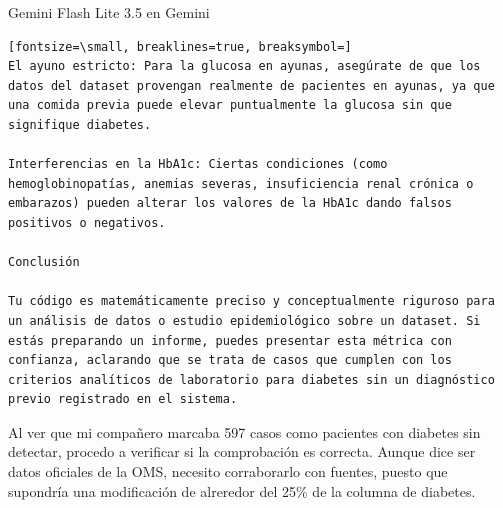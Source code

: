 \documentclass[12pt,a4paper,oneside]{book}
\begin{document}
\begin{iaresp}{Gemini Flash Lite 3.5 en Gemini}
\begin{Verbatim}[fontsize=\small, breaklines=true, breaksymbol=]
El ayuno estricto: Para la glucosa en ayunas, asegúrate de que los datos del dataset provengan realmente de pacientes en ayunas, ya que una comida previa puede elevar puntualmente la glucosa sin que signifique diabetes.

Interferencias en la HbA1c: Ciertas condiciones (como hemoglobinopatías, anemias severas, insuficiencia renal crónica o embarazos) pueden alterar los valores de la HbA1c dando falsos positivos o negativos.

Conclusión

Tu código es matemáticamente preciso y conceptualmente riguroso para un análisis de datos o estudio epidemiológico sobre un dataset. Si estás preparando un informe, puedes presentar esta métrica con confianza, aclarando que se trata de casos que cumplen con los criterios analíticos de laboratorio para diabetes sin un diagnóstico previo registrado en el sistema.
\end{Verbatim}
\end{iaresp}
\begin{iaanalisis}
Al ver que mi compañero marcaba 597 casos como pacientes con diabetes sin detectar, procedo a verificar si la comprobación es correcta. Aunque dice ser datos oficiales de la OMS, necesito corraborarlo con fuentes, puesto que supondría una modificación de alreredor del 25\% de la columna de diabetes.
\end{iaanalisis}
\end{document}
